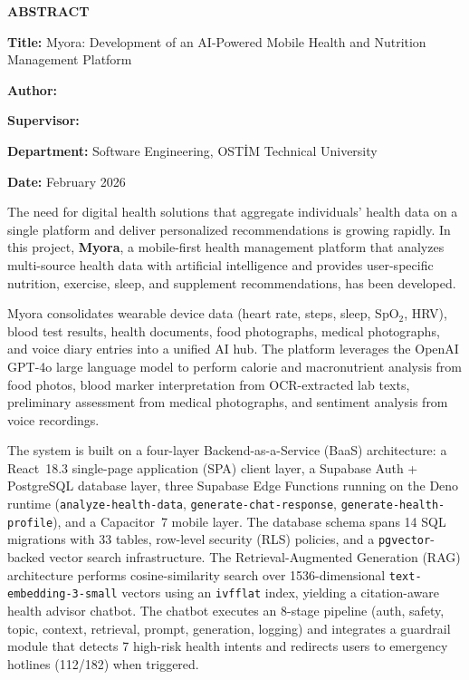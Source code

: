 \clearpage
\thispagestyle{empty}

\begin{center}
{\Large \textbf{ABSTRACT}}
\end{center}

\vspace{0.5cm}

\noindent\textbf{Title:} Myora: Development of an AI-Powered Mobile Health and Nutrition Management Platform

\noindent\textbf{Author:} \authorname

\noindent\textbf{Supervisor:} \supname

\noindent\textbf{Department:} Software Engineering, OSTİM Technical University

\noindent\textbf{Date:} February 2026

\vspace{0.5cm}

The need for digital health solutions that aggregate individuals' health data on a single platform and deliver personalized recommendations is growing rapidly. In this project, \textbf{Myora}, a mobile-first health management platform that analyzes multi-source health data with artificial intelligence and provides user-specific nutrition, exercise, sleep, and supplement recommendations, has been developed.

Myora consolidates wearable device data (heart rate, steps, sleep, SpO$_2$, HRV), blood test results, health documents, food photographs, medical photographs, and voice diary entries into a unified AI hub. The platform leverages the OpenAI GPT-4o large language model to perform calorie and macronutrient analysis from food photos, blood marker interpretation from OCR-extracted lab texts, preliminary assessment from medical photographs, and sentiment analysis from voice recordings.

The system is built on a four-layer Backend-as-a-Service (BaaS) architecture: a React~18.3 single-page application (SPA) client layer, a Supabase Auth + PostgreSQL database layer, three Supabase Edge Functions running on the Deno runtime (\texttt{analyze-health-data}, \texttt{generate-chat-response}, \texttt{generate-health-profile}), and a Capacitor~7 mobile layer. The database schema spans 14 SQL migrations with 33 tables, row-level security (RLS) policies, and a \texttt{pgvector}-backed vector search infrastructure. The Retrieval-Augmented Generation (RAG) architecture performs cosine-similarity search over 1536-dimensional \texttt{text-embedding-3-small} vectors using an \texttt{ivfflat} index, yielding a citation-aware health advisor chatbot. The chatbot executes an 8-stage pipeline (auth, safety, topic, context, retrieval, prompt, generation, logging) and integrates a guardrail module that detects 7 high-risk health intents and redirects users to emergency hotlines (112/182) when triggered.

